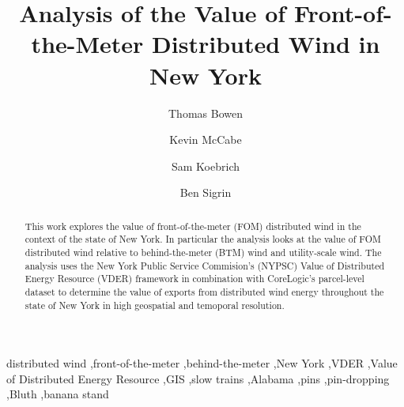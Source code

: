 
\begin{frontmatter}

\title{Analysis of the Value of Front-of-the-Meter Distributed Wind in New York}

\author[]{Thomas Bowen}
\author[]{Kevin McCabe}
\author[]{Sam Koebrich}
\author[]{Ben Sigrin}

\address{National Renewable Energy Laboratory, 15013 Denver West Parkway, Golden, CO 80401}

\fntext[label2]{\nrel{}} 

\begin{abstract}
This work explores the value of front-of-the-meter (FOM) distributed wind in the context of the state of New York. In particular the analysis looks at the value of FOM distributed wind relative to behind-the-meter (BTM) wind and utility-scale wind. The analysis uses the New York Public Service Commision's (NYPSC) Value of Distributed Energy Resource (VDER) framework in combination with CoreLogic's parcel-level dataset to determine the value of exports from distributed wind energy throughout the state of New York in high geospatial and temoporal resolution.
\end{abstract}

\begin{keyword}
distributed wind \sep front-of-the-meter \sep behind-the-meter \sep New York \sep VDER \sep Value of Distributed Energy Resource \sep GIS \sep slow trains \sep Alabama \sep pins \sep pin-dropping \sep Bluth \sep banana stand
\end{keyword}

\end{frontmatter}

\tableofcontents

\clearpage %


